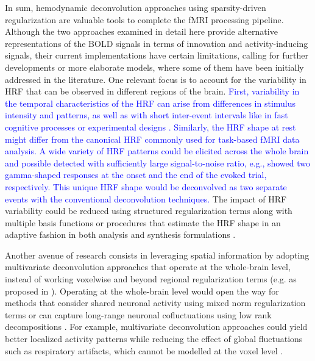 In sum, hemodynamic deconvolution approaches using sparsity-driven
regularization are valuable tools to complete the fMRI processing pipeline.
Although the two approaches examined in detail here provide alternative
representations of the BOLD signals in terms of innovation and activity-inducing
signals, their current implementations have certain limitations, calling for
further developments or more elaborate models, where some of them have been
initially addressed in the literature. One relevant focus is to account for the
variability in HRF that can be observed in different regions of the brain.
\textcolor{blue}{First, variability in the temporal characteristics of the HRF
can arise from differences in stimulus intensity and patterns, as well as with
short inter-event intervals like in fast cognitive processes or experimental
designs
\citep{Yesilyurt2008DynamicsnonlinearitiesBOLD,Chen2021Investigatingmechanismsfast,
Sadaghiani2009Neuralactivityinduced,Polimeni2021Imagingfasterneural}.
Similarly, the HRF shape at rest might differ from the canonical HRF commonly
used for task-based fMRI data analysis. A wide variety of HRF patterns could be
elicited across the whole brain and possible detected with sufficiently large
signal-to-noise ratio, e.g., \citep{GonzalezCastillo2012Wholebraintime} showed
two gamma-shaped responses at the onset and the end of the evoked trial,
respectively. This unique HRF shape would be deconvolved as two separate events
with the conventional deconvolution techniques.} The impact of HRF variability
could be reduced using structured regularization terms along with multiple basis
functions \citep{Gaudes2012Structuredsparsedeconvolution} or procedures that
estimate the HRF shape in an adaptive fashion in both analysis
\citep{Farouj2019BoldSignalDeconvolution} and synthesis formulations
\citep{cherkaoui:hal-03005584}.

Another avenue of research consists in leveraging spatial information by
adopting multivariate deconvolution approaches that operate at the whole-brain
level, instead of working voxelwise and beyond regional regularization terms
(e.g. as proposed in \citealt{Karahanoglu2013TotalactivationfMRI}). Operating
at the whole-brain level would open the way for methods that consider shared
neuronal activity using mixed norm regularization terms
\citep{urunuela-tremino_2019} or can capture long-range neuronal cofluctuations
using low rank decompositions \citep{cherkaoui:hal-03005584}. For example,
multivariate deconvolution approaches could yield better localized activity
patterns while reducing the effect of global fluctuations such as respiratory
artifacts, which cannot be modelled at the voxel level \citep{Urunuela_2021}.

